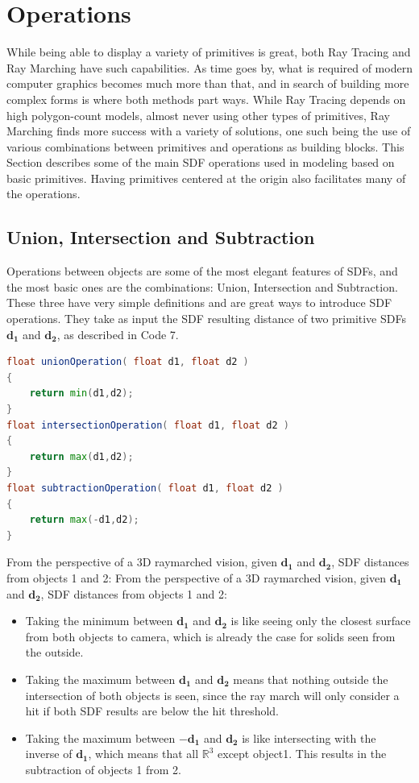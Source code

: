 \section{Operations}

While being able to display a variety of primitives is great, both Ray Tracing and Ray Marching have such capabilities. As time goes by, what is required of modern computer graphics becomes much more than that, and in search of building more complex forms is where both methods part ways. While Ray Tracing depends on high polygon-count models, almost never using other types of primitives, Ray Marching finds more success with a variety of solutions, one such being the use of various combinations between primitives and operations as building blocks.
This Section describes some of the main SDF operations used in modeling based on basic primitives. Having primitives centered at the origin also facilitates many of the operations.

\subsection{Union, Intersection and Subtraction}

Operations between objects are some of the most elegant features of SDFs, and the most basic ones are the combinations: Union, Intersection and Subtraction. These three have very simple definitions and are great ways to introduce SDF operations. They take as input the SDF resulting distance of two primitive SDFs $\mathbf{d_1}$ and $\mathbf{d_2}$, as described in Code 7.


\begin{lstlisting}[language=GLSL, caption={Code 7: SDF Union, Intersection and Subtraction}, label={lst:UnionIntersectionSubtraction} float=ht]
float unionOperation( float d1, float d2 )
{
    return min(d1,d2);
}
float intersectionOperation( float d1, float d2 )
{
    return max(d1,d2);
}
float subtractionOperation( float d1, float d2 )
{
    return max(-d1,d2);
}
\end{lstlisting}

From the perspective of a 3D raymarched vision, given $\mathbf{d_1}$ and $\mathbf{d_2}$, SDF distances from objects 1 and 2:
From the perspective of a 3D raymarched vision, given $\mathbf{d_1}$ and $\mathbf{d_2}$, SDF distances from objects 1 and 2:

\begin{itemize}
    \item Taking the minimum between $\mathbf{d_1}$ and $\mathbf{d_2}$ is like seeing only the closest surface from both objects to camera, which is already the case for solids seen from the outside.
    \item Taking the maximum between $\mathbf{d_1}$ and $\mathbf{d_2}$ means that nothing outside the intersection of both objects is seen, since the ray march will only consider a hit if both SDF results are below the hit threshold.
    \item Taking the maximum between $\mathbf{-d_1}$ and $\mathbf{d_2}$ is like intersecting with the inverse of $\mathbf{d_1}$, which means that all $\mathbb{R}^3 $ except object1. This results in the subtraction of objects 1 from 2.
\end{itemize}

